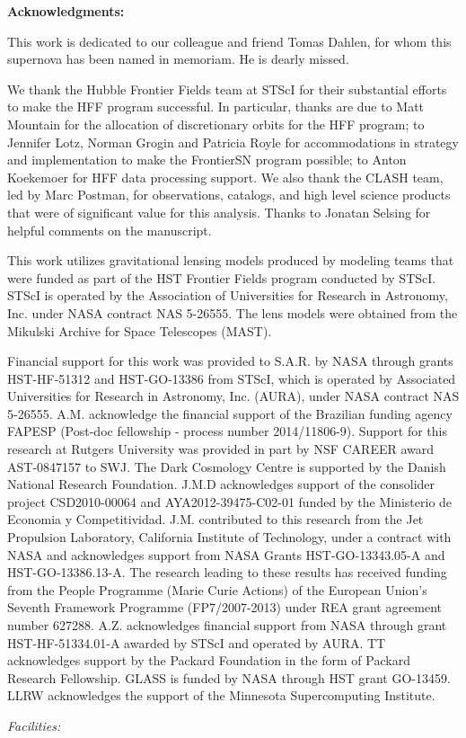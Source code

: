 \bigskip


{\bf Acknowledgments:}

This work is dedicated to our colleague and friend Tomas Dahlen, for
whom this supernova has been named in memoriam. He is dearly missed.

We thank the Hubble Frontier Fields team at STScI for their
substantial efforts to make the HFF program successful.  In
particular, thanks are due to Matt Mountain for the allocation of
discretionary orbits for the HFF program; to Jennifer Lotz, Norman
Grogin and Patricia Royle for accommodations in strategy and
implementation to make the FrontierSN program possible; to Anton
Koekemoer for HFF data processing support.  We also thank
the CLASH team, led by Marc Postman, for observations, catalogs, and
high level science products that were of significant value for this
analysis.  Thanks to Jonatan Selsing for helpful comments on the
manuscript.

This work utilizes gravitational lensing models produced by modeling
teams that were funded as part of the HST Frontier Fields program
conducted by STScI. STScI is operated by the Association of
Universities for Research in Astronomy, Inc. under NASA contract NAS
5-26555. The lens models were obtained from the Mikulski Archive for
Space Telescopes (MAST).

Financial support for this work was provided to S.A.R. by NASA through
grants HST-HF-51312 and HST-GO-13386 from STScI, which is operated by
Associated Universities for Research in Astronomy, Inc. (AURA), under
NASA contract NAS 5-26555. A.M. acknowledge the financial support of
the Brazilian funding agency FAPESP (Post-doc fellowship - process
number 2014/11806-9). Support for this research at Rutgers University
was provided in part by NSF CAREER award AST-0847157 to SWJ.  The Dark
Cosmology Centre is supported by the Danish National Research
Foundation. J.M.D acknowledges support of the consolider project
CSD2010-00064 and AYA2012-39475-C02-01 funded by the Ministerio de
Economia y Competitividad. J.M. contributed to this research from the
Jet Propulsion Laboratory, California Institute of Technology, under a
contract with NASA and acknowledges support from NASA Grants
HST-GO-13343.05-A and HST-GO-13386.13-A. The research leading to these
results has received funding from the People Programme (Marie Curie
Actions) of the European Union's Seventh Framework Programme
(FP7/2007-­2013) under REA grant agreement number
627288. A.Z. acknowledges financial support from NASA through grant
HST-HF-51334.01-A awarded by STScI and operated by AURA. 
TT acknowledges support by the Packard Foundation in the form of Packard Research Fellowship. GLASS is funded by NASA through HST grant GO-13459. LLRW
acknowledges the support of the Minnesota Supercomputing Institute.

{\it Facilities:} 
\pagebreak

%






